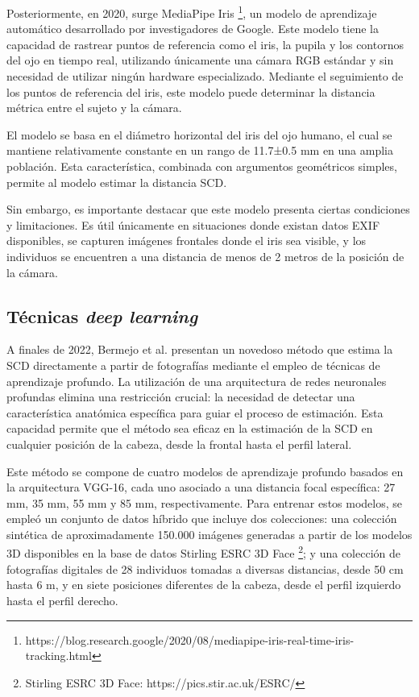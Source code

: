 Posteriormente, en 2020, surge MediaPipe Iris \footnote{https://blog.research.google/2020/08/mediapipe-iris-real-time-iris-tracking.html}, un modelo de aprendizaje automático desarrollado por investigadores de Google. Este modelo tiene la capacidad de rastrear puntos de referencia como el iris, la pupila y los contornos del ojo en tiempo real, utilizando únicamente una cámara RGB estándar y sin necesidad de utilizar ningún hardware especializado. Mediante el seguimiento de los puntos de referencia del iris, este modelo puede determinar la distancia métrica entre el sujeto y la cámara.

El modelo se basa en el diámetro horizontal del iris del ojo humano, el cual se mantiene relativamente constante en un rango de 11.7±0.5 mm en una amplia población. Esta característica, combinada con argumentos geométricos simples, permite al modelo estimar la distancia SCD.

Sin embargo, es importante destacar que este modelo presenta ciertas condiciones y limitaciones. Es útil únicamente en situaciones donde existan datos EXIF disponibles, se capturen imágenes frontales donde el iris sea visible, y los individuos se encuentren a una distancia de menos de 2 metros de la posición de la cámara.

\subsection{Técnicas \textit{deep learning}}

A finales de 2022, Bermejo et al. \cite{14} presentan un novedoso método que estima la SCD directamente a partir de fotografías mediante el empleo de técnicas de aprendizaje profundo. La utilización de una arquitectura de redes neuronales profundas elimina una restricción crucial: la necesidad de detectar una característica anatómica específica para guiar el proceso de estimación. Esta capacidad permite que el método sea eficaz en la estimación de la SCD en cualquier posición de la cabeza, desde la frontal hasta el perfil lateral.

Este método se compone de cuatro modelos de aprendizaje profundo basados en la arquitectura VGG-16, cada uno asociado a una distancia focal específica: 27 mm, 35 mm, 55 mm y 85 mm, respectivamente. Para entrenar estos modelos, se empleó un conjunto de datos híbrido que incluye dos colecciones: una colección sintética de aproximadamente 150.000 imágenes generadas a partir de los modelos 3D disponibles en la base de datos Stirling ESRC 3D Face \footnote{Stirling ESRC 3D Face: https://pics.stir.ac.uk/ESRC/}; y una colección de fotografías digitales de 28 individuos tomadas a diversas distancias, desde 50 cm hasta 6 m, y en siete posiciones diferentes de la cabeza, desde el perfil izquierdo hasta el perfil derecho.

